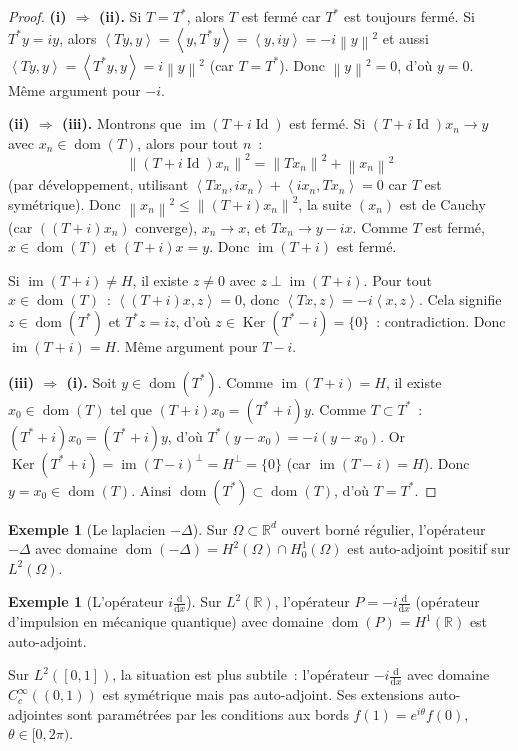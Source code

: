 \documentclass[a4paper,12pt]{book}
\DeclareMathOperator{\im}{im}
\DeclareMathOperator{\Id}{Id}
\DeclareMathOperator{\Ker}{Ker}
\DeclareMathOperator{\dom}{dom}
\newcommand{\R}{\mathbb{R}}
\newcommand{\dd}{\mathrm{d}}
\newcommand{\norm}[1]{\left\| #1 \right\|}
\newcommand{\inner}[2]{\left\langle #1, #2 \right\rangle}
\theoremstyle{definition}
\newtheorem{exemple}[definition]{Exemple}
\theoremstyle{plain}
\theoremstyle{remark}
\begin{document}
\begin{proof}
\textbf{(i) $\Rightarrow$ (ii).} Si $T = T^*$, alors $T$ est fermé car $T^*$ est
toujours fermé. Si $T^*y = iy$, alors $\inner{Ty}{y} = \inner{y}{T^*y} = \inner{y}{iy} = -i\norm{y}^2$ et aussi $\inner{Ty}{y} = \inner{T^*y}{y} = i\norm{y}^2$ (car $T = T^*$). Donc
$\norm{y}^2 = 0$, d'où $y = 0$. Même argument pour $-i$.

\textbf{(ii) $\Rightarrow$ (iii).} Montrons que $\im(T + i\Id)$ est fermé. Si
$(T + i\Id)x_n \to y$ avec $x_n \in \dom(T)$, alors pour tout $n$~:
\[
  \norm{(T + i\Id)x_n}^2 = \norm{Tx_n}^2 + \norm{x_n}^2
\]
(par développement, utilisant $\inner{Tx_n}{ix_n} + \inner{ix_n}{Tx_n} = 0$ car $T$ est
symétrique). Donc $\norm{x_n}^2 \le \norm{(T+i)x_n}^2$, la suite $(x_n)$ est de Cauchy
(car $((T+i)x_n)$ converge), $x_n \to x$, et $Tx_n \to y - ix$. Comme $T$ est fermé,
$x \in \dom(T)$ et $(T+i)x = y$. Donc $\im(T+i)$ est fermé.

Si $\im(T+i) \neq H$, il existe $z \neq 0$ avec $z \perp \im(T+i)$. Pour tout
$x \in \dom(T)$~: $\inner{(T+i)x}{z} = 0$, donc $\inner{Tx}{z} = -i\inner{x}{z}$.
Cela signifie $z \in \dom(T^*)$ et $T^*z = iz$, d'où $z \in \Ker(T^* - i) = \{0\}$~:
contradiction. Donc $\im(T+i) = H$. Même argument pour $T - i$.

\textbf{(iii) $\Rightarrow$ (i).} Soit $y \in \dom(T^*)$. Comme $\im(T+i) = H$, il
existe $x_0 \in \dom(T)$ tel que $(T+i)x_0 = (T^*+i)y$. Comme $T \subset T^*$~:
$(T^*+i)x_0 = (T^*+i)y$, d'où $T^*(y - x_0) = -i(y - x_0)$. Or
$\Ker(T^* + i) = \im(T - i)^\perp = H^\perp = \{0\}$ (car $\im(T-i) = H$). Donc
$y = x_0 \in \dom(T)$. Ainsi $\dom(T^*) \subset \dom(T)$, d'où $T = T^*$.
\end{proof}

\begin{exemple}[Le laplacien $-\Delta$]
\label{ex:laplacien}
Sur $\Omega \subset \R^d$ ouvert borné régulier, l'opérateur $-\Delta$ avec domaine
$\dom(-\Delta) = H^2(\Omega) \cap H^1_0(\Omega)$ est auto-adjoint positif sur
$L^2(\Omega)$.
\end{exemple}

\begin{exemple}[{L'opérateur $i\frac{\dd}{\dd x}$}]
\label{ex:derivee-autoadjoint}
Sur $L^2(\R)$, l'opérateur $P = -i\frac{\dd}{\dd x}$ (opérateur d'impulsion en
mécanique quantique) avec domaine $\dom(P) = H^1(\R)$ est auto-adjoint.

Sur $L^2([0,1])$, la situation est plus subtile~: l'opérateur $-i\frac{\dd}{\dd x}$ avec
domaine $C_c^\infty((0,1))$ est symétrique mais pas auto-adjoint. Ses extensions
auto-adjointes sont paramétrées par les conditions aux bords
$f(1) = e^{i\theta}f(0)$, $\theta \in [0, 2\pi)$.
\end{exemple}
\end{document}
